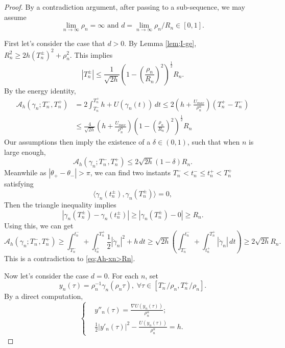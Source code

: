 \documentclass[11pt]{amsart}
\newcommand{\A}{\mathcal A}
\newcommand{\al}{\alpha}
\newcommand{\gm}{\gamma}
\newcommand{\dl}{\delta}
\newcommand{\tht}{\theta}
\newcommand{\ey}{\frac{1}{2}}
\theoremstyle{plain}
\theoremstyle{definition}
\theoremstyle{remark}
\begin{document}
\begin{proof}
By a contradiction argument, after passing to a  sub-sequence, we may assume 
$$ \lim_{n \to \infty} \rho_n =\infty \text{ and } d = \lim_{n \to \infty} \rho_n /R_n \in [0, 1]. $$

First let's consider the case that $d >0$. By Lemma \ref{lem;I-ge}, $R_n^2 \ge 2h (T^{\pm}_n)^2 + \rho_n^2$. This implies
$$ |T_n^{\pm}| \le \frac{1}{\sqrt{2h}} \left( 1 -\left( \frac{\rho_n}{R_n} \right)^2 \right)^{\ey} R_n. $$
By the energy identity,
\begin{equation*} 
\begin{aligned}
\A_h(\gm_n; T_n^-, T_n^+) & = 2 \int_{T_n^-}^{T_n^+} h + U(\gm_n(t)) \,dt \le 2 \left( h + \frac{U_{max}}{\rho_n^{\al}} \right) (T^+_n -T^-_n) \\
& \le \frac{4}{\sqrt{2h}} \left( h + \frac{U_{max}}{\rho_n^{\al}} \right)  \left( 1 -\left( \frac{\rho_n}{R_n} \right)^2 \right)^{\ey} R_n
\end{aligned}
\end{equation*} 
Our assumptions then imply the existence of a $\dl \in (0, 1)$, such that when $n$ is large enough,
\begin{equation} \label{eq;Ah-xn>Rn}
\A_h(\gm_n; T_n^-, T_n^+)  \le 2 \sqrt{2h} (1 - \dl) R_n.
\end{equation}
Meanwhile as $ |\tht_+ - \tht_-|>\pi$, we can find two instants $T_n^- < t_n^- \le t_n^+ < T_n^+$ satisfying
$$ \langle \gm_n(t_n^{\pm}), \gm_n(T_n^{\pm}) \rangle =0,$$
Then the triangle inequality implies 
$$ |\gm_n(T_n^{\pm}) - \gm_n(t_n^{\pm})| \ge |\gm_n(T_n^{\pm}) -0| \ge R_n. $$
Using this, we can get 
$$  
\A_h(\gm_n; T_n^-, T_n^+)  \ge \int_{T_n^-}^{t_n^-} + \int_{t_n^+}^{T_n^+} \ey |\dot{\gm}_n|^2 + h \,dt  \ge \sqrt{2h}   \left( \int_{T_n^-}^{t_n^-}  + \int_{t_n^+}^{T_n^+} |\dot{\gm}_n|  \,dt \right) \ge 2 \sqrt{2h} R_n.  
$$
This is a contradiction to \eqref{eq;Ah-xn>Rn}. 

Now let's consider the case $d=0$. For each $n$, set 
$$ y_n(\tau) = \rho_n^{-1} \gm_n(\rho_n \tau), \; \forall \tau \in [T_n^-/\rho_n, T_n^+/\rho_n]. $$
By a direct computation,
\begin{equation}
\label{eq;yn''} \begin{cases}
& y''_n(\tau) = \frac{\nabla U(y_n(\tau))}{\rho_n^{\al}  }; \\
& \ey |y'_n(\tau)|^2 - \frac{U(y_n(\tau))}{\rho_n^{\al} } = h.
\end{cases}
\end{equation} 


\end{proof}
\end{document}
